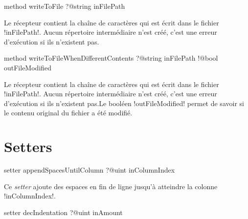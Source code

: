 
\begin{galgasbox}
method writeToFile ?@string inFilePath
\end{galgasbox}

Le récepteur contient la chaîne de caractères qui est écrit dans le fichier \ggs!inFilePath!. Aucun répertoire intermédiaire n'est créé, c'est une erreur d'exécution si ils n'existent pas.










\begin{galgasbox}
method writeToFileWhenDifferentContents
    ?@string inFilePath
    !@bool outFileModified
\end{galgasbox}

Le récepteur contient la chaîne de caractères qui est écrit dans le fichier \ggs!inFilePath!. Aucun répertoire intermédiaire n'est créé, c'est une erreur d'exécution si ils n'existent pas.Le booléen \ggs!outFileModified! permet de savoir si le contenu original du fichier a été modifié.















\section{Setters}


\begin{galgasbox}
setter appendSpacesUntilColumn ?@uint inColumnIndex
\end{galgasbox}

Ce \emph{setter} ajoute des espaces en fin de ligne jusqu'à atteindre la colonne \ggs!inColumnIndex!.





\begin{galgasbox}
setter decIndentation ?@uint inAmount
\end{galgasbox}

